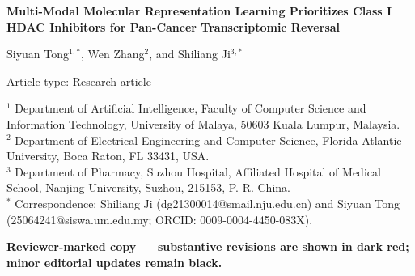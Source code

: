 \documentclass[11pt]{article}
\begin{document}
\linenumbers

\begin{titlepage}
\centering
{\LARGE\bfseries Multi-Modal Molecular Representation Learning Prioritizes Class I HDAC Inhibitors for Pan-Cancer Transcriptomic Reversal\par}
\vspace{1.2cm}
{\large Siyuan Tong$^{1,*}$, Wen Zhang$^{2}$, and Shiliang Ji$^{3,*}$\par}
\vspace{0.4cm}
{\normalsize Article type: Research article\par}
\vspace{0.8cm}
\begin{flushleft}
$^{1}$ Department of Artificial Intelligence, Faculty of Computer Science and Information Technology, University of Malaya, 50603 Kuala Lumpur, Malaysia.\\
$^{2}$ Department of Electrical Engineering and Computer Science, Florida Atlantic University, Boca Raton, FL 33431, USA.\\
$^{3}$ Department of Pharmacy, Suzhou Hospital, Affiliated Hospital of Medical School, Nanjing University, Suzhou, 215153, P. R. China.\\[0.5em]
$^{*}$ Correspondence: Shiliang Ji (dg21300014@smail.nju.edu.cn) and Siyuan Tong (25064241@siswa.um.edu.my; ORCID: 0009-0004-4450-083X).
\end{flushleft}
\ifdefined\reviewmarkedversion
\vspace{0.7em}
\begin{nolinenumbers}
    {\color{revisionred}\textbf{Reviewer-marked copy --- substantive revisions are shown in dark red; minor editorial updates remain black.}\par}
\end{nolinenumbers}
\fi
\vfill
\end{titlepage}

\ifdefined\reviewmarkedversion
{\color{revisionred}}
\else

\fi


\end{document}
